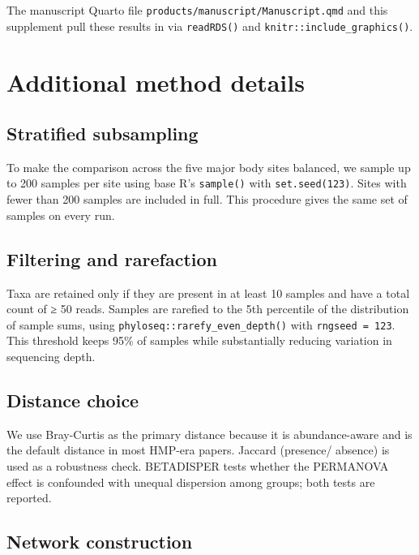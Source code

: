 \documentclass[
  letterpaper,
  DIV=11,
  numbers=noendperiod]{scrartcl}
\begin{document}
The manuscript Quarto file \texttt{products/manuscript/Manuscript.qmd}
and this supplement pull these results in via \texttt{readRDS()} and
\texttt{knitr::include\_graphics()}.

\newpage{}

\section{Additional method details}\label{additional-method-details}

\subsection{Stratified subsampling}\label{stratified-subsampling}

To make the comparison across the five major body sites balanced, we
sample up to 200 samples per site using base R's \texttt{sample()} with
\texttt{set.seed(123)}. Sites with fewer than 200 samples are included
in full. This procedure gives the same set of samples on every run.

\subsection{Filtering and rarefaction}\label{filtering-and-rarefaction}

Taxa are retained only if they are present in at least 10 samples and
have a total count of ≥ 50 reads. Samples are rarefied to the 5th
percentile of the distribution of sample sums, using
\texttt{phyloseq::rarefy\_even\_depth()} with \texttt{rngseed\ =\ 123}.
This threshold keeps 95\% of samples while substantially reducing
variation in sequencing depth.

\subsection{Distance choice}\label{distance-choice}

We use Bray-Curtis as the primary distance because it is abundance-aware
and is the default distance in most HMP-era papers. Jaccard (presence/
absence) is used as a robustness check. BETADISPER tests whether the
PERMANOVA effect is confounded with unequal dispersion among groups;
both tests are reported.

\subsection{Network construction}\label{network-construction}
\end{document}
